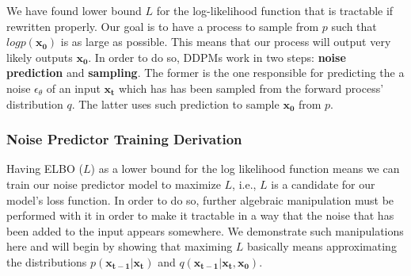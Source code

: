 \documentclass{article}
\begin{document}
We have found lower bound $L$ for the log-likelihood function that is tractable if rewritten properly. Our goal is to have a process to sample from $p$ such that $log p(\mathbf{x_0})$ is as large as possible. This means that our process will output very likely outputs $\mathbf{x_0}$. In order to do so, DDPMs work in two steps: \textbf{noise prediction} and \textbf{sampling}. The former is the one responsible for predicting the a noise $\epsilon_\theta$ of an input $\mathbf{x_t}$ which has has been sampled from the forward process' distribution $q$. The latter uses such prediction to sample $\mathbf{x_0}$ from $p$.

\subsubsection{Noise Predictor Training Derivation}

Having ELBO ($L$) as a lower bound for the log likelihood function means we can train our noise predictor model to maximize $L$, i.e., $L$ is a candidate for our model's loss function. In order to do so, further algebraic manipulation must be performed with it in order to make it tractable in a way that the noise that has been added to the input appears somewhere. We demonstrate such manipulations here and will begin by showing that maximing $L$ basically means approximating the distributions $p(\mathbf{x_{t-1} | x_t}) $ and $q(\mathbf{x_{t-1} | x_t,  x_0})$.
\end{document}
